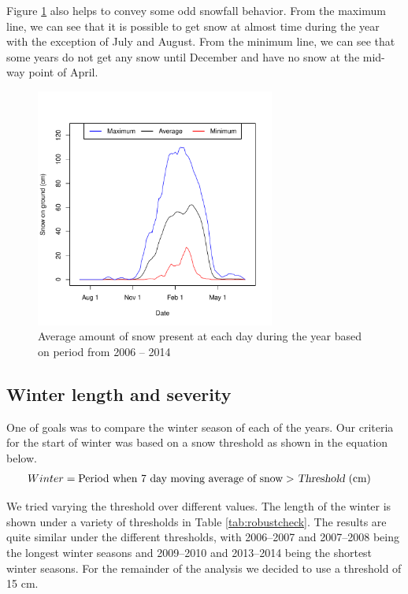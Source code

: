 \documentclass[12pt,twoside]{article}
\begin{document}
{Figure \ref{fig:averagetsplot} also helps to convey some odd snowfall behavior. From the maximum line, we can see that it is possible to get snow at almost time during the year with the exception of July and August. From the minimum line, we can see that some years do not get any snow until December and have no snow at the mid-way point of April.


\begin{figure}[!ht]
\begin{center}
\includegraphics[width=0.7\textwidth]{report-averagetsplot}
\end{center}
\vspace{-8mm}
\caption{Average amount of snow present at each day during the year based on period from 2006 -- 2014}
\label{fig:averagetsplot}
\end{figure}

\subsection{Winter length and severity}

One of goals was to compare the winter season of each of the years. Our criteria for the start of winter was based on a snow threshold as shown in the equation below.
%
\begin{align*}
Winter &= \text{Period when } \text{7 day moving average of} \text{ snow} > \textsl{Threshold} \text{ (cm)}
\end{align*}

\medskip We tried varying the threshold over different values. The length of the winter is shown under a variety of thresholds in Table \ref{tab:robustcheck}. The results are quite similar under the different thresholds, with 2006--2007 and 2007--2008 being the longest winter seasons and 2009--2010 and 2013--2014 being the shortest winter seasons. For the remainder of the analysis we decided to use a threshold of 15 cm.

}
\end{document}
